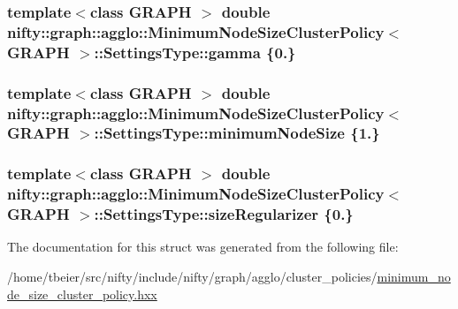 \subsubsection[{gamma}]{\setlength{\rightskip}{0pt plus 5cm}template$<$class G\+R\+A\+P\+H $>$ double {\bf nifty\+::graph\+::agglo\+::\+Minimum\+Node\+Size\+Cluster\+Policy}$<$ G\+R\+A\+P\+H $>$\+::Settings\+Type\+::gamma \{0.\}}\label{structnifty_1_1graph_1_1agglo_1_1MinimumNodeSizeClusterPolicy_1_1SettingsType_accfd8d8dc5d46ac1d15e22b529772e0d}
\hypertarget{structnifty_1_1graph_1_1agglo_1_1MinimumNodeSizeClusterPolicy_1_1SettingsType_ab282c9efb91cfaa63a2052694291bbc6}{}
\subsubsection[{minimum\+Node\+Size}]{\setlength{\rightskip}{0pt plus 5cm}template$<$class G\+R\+A\+P\+H $>$ double {\bf nifty\+::graph\+::agglo\+::\+Minimum\+Node\+Size\+Cluster\+Policy}$<$ G\+R\+A\+P\+H $>$\+::Settings\+Type\+::minimum\+Node\+Size \{1.\}}\label{structnifty_1_1graph_1_1agglo_1_1MinimumNodeSizeClusterPolicy_1_1SettingsType_ab282c9efb91cfaa63a2052694291bbc6}
\hypertarget{structnifty_1_1graph_1_1agglo_1_1MinimumNodeSizeClusterPolicy_1_1SettingsType_a2b5ed9ffa611e37a818f32186cc39d24}{}
\subsubsection[{size\+Regularizer}]{\setlength{\rightskip}{0pt plus 5cm}template$<$class G\+R\+A\+P\+H $>$ double {\bf nifty\+::graph\+::agglo\+::\+Minimum\+Node\+Size\+Cluster\+Policy}$<$ G\+R\+A\+P\+H $>$\+::Settings\+Type\+::size\+Regularizer \{0.\}}\label{structnifty_1_1graph_1_1agglo_1_1MinimumNodeSizeClusterPolicy_1_1SettingsType_a2b5ed9ffa611e37a818f32186cc39d24}


The documentation for this struct was generated from the following file\+:\begin{DoxyCompactItemize}
\item 
/home/tbeier/src/nifty/include/nifty/graph/agglo/cluster\+\_\+policies/\hyperlink{minimum__node__size__cluster__policy_8hxx}{minimum\+\_\+node\+\_\+size\+\_\+cluster\+\_\+policy.\+hxx}\end{DoxyCompactItemize}
